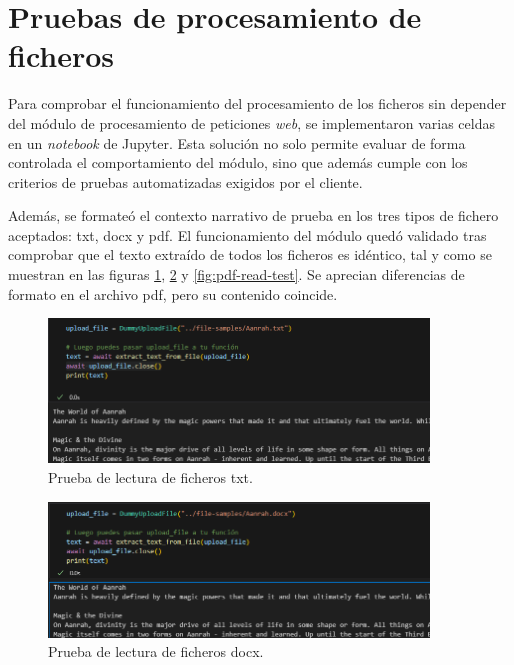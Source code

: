 
\section{Pruebas de procesamiento de ficheros}
Para comprobar el funcionamiento del procesamiento de los ficheros sin depender del módulo de procesamiento de peticiones \textit{web},
se implementaron varias celdas en un \textit{notebook} de Jupyter.
Esta solución no solo permite evaluar de forma controlada el comportamiento del módulo,
sino que además cumple con los criterios de pruebas automatizadas exigidos por el cliente.

Además, se formateó el contexto narrativo de prueba en los tres tipos de fichero aceptados: txt, docx y pdf.
El funcionamiento del módulo quedó validado tras comprobar que el texto extraído de todos los ficheros es idéntico,
tal y como se muestran en las figuras \ref{fig:txt-read-test}, \ref{fig:docx-read-test} y \ref{fig:pdf-read-test}.
Se aprecian diferencias de formato en el archivo pdf, pero su contenido coincide.

\begin{figure}[htbp]
	\centering
	\includegraphics[width=0.9\textwidth]{./Figures/file-read-test-txt.png}
	\caption{Prueba de lectura de ficheros txt.}
	\label{fig:txt-read-test}
\end{figure}

\begin{figure}[htbp]
	\centering
	\includegraphics[width=0.9\textwidth]{./Figures/file-read-test-docx.png}
	\caption{Prueba de lectura de ficheros docx.}
	\label{fig:docx-read-test}
\end{figure}

